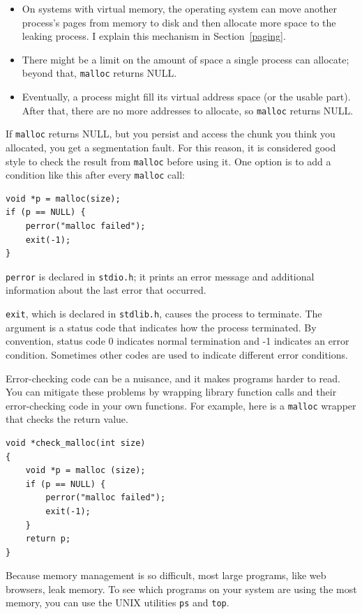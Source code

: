\documentclass[12pt]{book}
\begin{document}
{\begin{itemize}
\item On systems with virtual memory, the operating system can move
  another process's pages from memory to disk and then allocate
  more space to the leaking process.  I explain this mechanism
  in Section~\ref{paging}.

\item There might be a limit on the amount of space a single
  process can allocate; beyond that, {\tt malloc} returns NULL.

\item Eventually, a process might fill its virtual address space (or
  the usable part).  After that, there are no more addresses to
  allocate, so {\tt malloc} returns NULL.

\end{itemize}

If {\tt malloc} returns NULL, but you persist and access
the chunk you think you allocated, you get a segmentation fault.
For this reason, it is considered good style to check the result from
{\tt malloc} before using it.  One option is to add a condition like
this after every {\tt malloc} call:

\begin{verbatim}
void *p = malloc(size);
if (p == NULL) {
    perror("malloc failed");
    exit(-1);
}
\end{verbatim}

{\tt perror} is declared in {\tt stdio.h}; it prints
an error message and additional information about the last error
that occurred.

{\tt exit}, which is declared in {\tt stdlib.h}, causes the process
to terminate.  The argument is a status code that indicates how
the process terminated.  By convention, status code 0 indicates normal
termination and -1 indicates an error condition.  Sometimes other
codes are used to indicate different error conditions.

Error-checking code can be a nuisance, and it makes programs
harder to read.  You can mitigate these problems by wrapping library
function calls and their error-checking code in your own
functions.  For example, here is a {\tt malloc} wrapper that checks
the return value.

\begin{verbatim}
void *check_malloc(int size)
{
    void *p = malloc (size);
    if (p == NULL) {
        perror("malloc failed");
        exit(-1);
    }
    return p;
}
\end{verbatim}

Because memory management is so difficult, most large programs, like
web browsers, leak memory.  To see which programs on your system are
using the most memory, you can use the UNIX utilities {\tt ps} and
{\tt top}.


}
\end{document}
